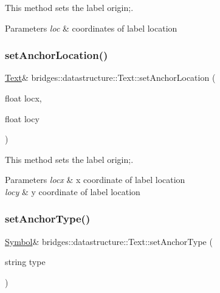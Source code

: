 This method sets the label origin;. 


\begin{DoxyParams}{Parameters}
{\em loc} & coordinates of label location \\
\hline
\end{DoxyParams}
\mbox{\label{classbridges_1_1datastructure_1_1_text_ac7339ebe2bdbcd293c71650fbb0e084d}} 
\subsubsection{\texorpdfstring{set\+Anchor\+Location()}{setAnchorLocation()}\hspace{0.1cm}{\footnotesize\ttfamily [2/2]}}
{\footnotesize\ttfamily \hyperlink{classbridges_1_1datastructure_1_1_text}{Text}\& bridges\+::datastructure\+::\+Text\+::set\+Anchor\+Location (\begin{DoxyParamCaption}\item[{float}]{locx,  }\item[{float}]{locy }\end{DoxyParamCaption})\hspace{0.3cm}{\ttfamily [inline]}}



This method sets the label origin;. 


\begin{DoxyParams}{Parameters}
{\em locx} & x coordinate of label location \\
\hline
{\em locy} & y coordinate of label location \\
\hline
\end{DoxyParams}
\mbox{\label{classbridges_1_1datastructure_1_1_text_ae0f9d5e7719d8ed7d2883d838572b49f}} 
\subsubsection{\texorpdfstring{set\+Anchor\+Type()}{setAnchorType()}}
{\footnotesize\ttfamily \hyperlink{classbridges_1_1datastructure_1_1_symbol}{Symbol}\& bridges\+::datastructure\+::\+Text\+::set\+Anchor\+Type (\begin{DoxyParamCaption}\item[{string}]{type }\end{DoxyParamCaption})\hspace{0.3cm}{\ttfamily [inline]}}



